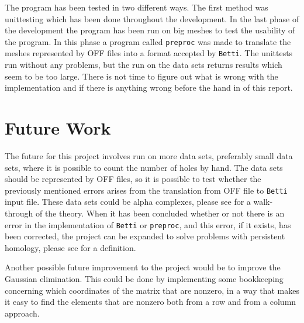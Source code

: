 \documentclass[11pt,a4paper,twoside, openright]{report}
\begin{document}
The program has been tested in two different ways. The first method was unittesting which has been done throughout the development. In the last phase of the development the program has been run on big meshes to test the usability of the program. In this phase a program called \texttt{preproc} was made to translate the meshes represented by OFF files into a format accepted by \texttt{Betti}. The unittests run without any problems, but the run on the data sets returns results which seem to be too large. There is not time to figure out what is wrong with the implementation and if there is anything wrong before the hand in of this report.

\section{Future Work}
The future for this project involves run on more data sets, preferably small data sets, where it is possible to count the number of holes by hand. The data sets should be represented by OFF files, so it is possible to test whether the previously mentioned errors arises from the translation from OFF file to \texttt{Betti} input file. These data sets could be alpha complexes, please see \cite{Edelsbrunner} for a walk-through of the theory. When it has been concluded whether or not there is an error in the implementation of \texttt{Betti} or \texttt{preproc}, and this error, if it exists, has been corrected, the project can be expanded to solve problems with persistent homology, please see \cite{Edelsbrunner} for a definition. 

Another possible future improvement to the project would be to improve the Gaussian elimination. This could be done by implementing some bookkeeping concerning which coordinates of the matrix that are nonzero, in a way that makes it easy to find the elements that are nonzero both from a row and from a column approach.
\end{document}
